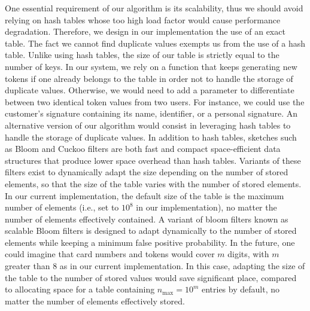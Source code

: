 \documentclass{llncs}
\newcounter{prob}
\begin{document}
One essential requirement of our algorithm is its scalability, thus we should avoid relying on hash tables whose too high load factor would cause performance degradation. Therefore, we design in our implementation the use of an exact table. The fact we cannot find duplicate values exempts us from the use of a hash table. Unlike using hash tables, the size of our table is strictly equal to the number of keys. In our system, we rely on a function that keeps generating new tokens if one already belongs to the table in order not to handle the storage of duplicate values. Otherwise, we would need to add a parameter to differentiate between two identical token values from two users. For instance, we could use the customer's signature containing its name, identifier, or a personal signature. An alternative version of our algorithm would consist in leveraging hash tables to handle the storage of duplicate values. In addition to hash tables, sketches such as Bloom and Cuckoo filters are both fast and compact space-efficient data structures that produce lower space overhead than hash tables.
Variants of these filters exist to dynamically adapt the size depending on the number of stored elements, so that the size of the table varies with the number of stored elements. In our current implementation, the default size of the table is the maximum number of elements (i.e., set to $10^8$ in our implementation), no matter the number of elements effectively contained. A variant of bloom filters known as scalable Bloom filters \cite{Almeida2007} is designed to adapt dynamically to the number of stored elements while keeping a minimum false positive probability. In the future, one could imagine that card numbers and tokens would cover $m$ digits, with $m$ greater than 8 as in our current implementation. In this case, adapting the size of the table to the number of stored values would save significant place, compared to allocating space for a table containing $n_{\max} = 10^m$ entries by default, no matter the number of elements effectively stored.



\end{document}
